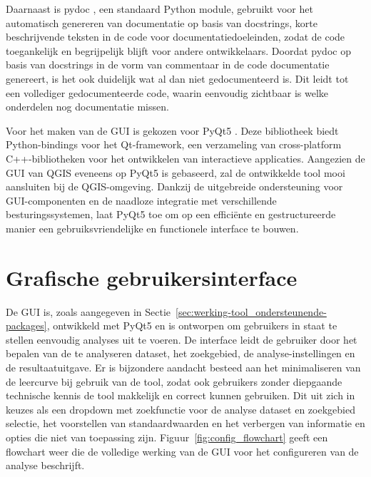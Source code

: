 Daarnaast is pydoc \autocite{PSF2026}, een standaard Python module, gebruikt voor het automatisch genereren van documentatie op basis van docstrings, korte beschrijvende teksten in de code voor documentatiedoeleinden, zodat de code toegankelijk en begrijpelijk blijft voor andere ontwikkelaars. Doordat pydoc op basis van docstrings in de vorm van commentaar in de code documentatie genereert, is het ook duidelijk wat al dan niet gedocumenteerd is. Dit leidt tot een vollediger gedocumenteerde code, waarin eenvoudig zichtbaar is welke onderdelen nog documentatie missen.
\medskip

Voor het maken van de GUI is gekozen voor PyQt5 \autocite{RCL2023}. Deze bibliotheek biedt Python-bindings voor het Qt-framework, een verzameling van cross-platform C++-bibliotheken voor het ontwikkelen van interactieve applicaties. 
Aangezien de GUI van QGIS eveneens op PyQt5 is gebaseerd, zal de ontwikkelde tool mooi aansluiten bij de QGIS-omgeving. Dankzij de uitgebreide ondersteuning voor GUI-componenten en de naadloze integratie met verschillende besturingssystemen, laat PyQt5 toe om op een efficiënte en gestructureerde manier een gebruiksvriendelijke en functionele interface te bouwen.\medskip


\section{Grafische gebruikersinterface}
De GUI is, zoals aangegeven in Sectie~\ref{sec:werking-tool_ondersteunende-packages}, ontwikkeld met PyQt5 en is ontworpen om gebruikers in staat te stellen eenvoudig analyses uit te voeren. De interface leidt de gebruiker door het bepalen van de te analyseren dataset, het zoekgebied, de analyse-instellingen en de resultaatuitgave. Er is bijzondere aandacht besteed aan het minimaliseren van de leercurve bij gebruik van de tool, zodat ook gebruikers zonder diepgaande technische kennis de tool makkelijk en correct kunnen gebruiken. Dit uit zich in keuzes als een dropdown met zoekfunctie voor de analyse dataset en zoekgebied selectie, het voorstellen van standaardwaarden en het verbergen van informatie en opties die niet van toepassing zijn. Figuur~\ref{fig:config_flowchart} geeft een flowchart weer die de volledige werking van de GUI voor het configureren van de analyse beschrijft.\medskip

